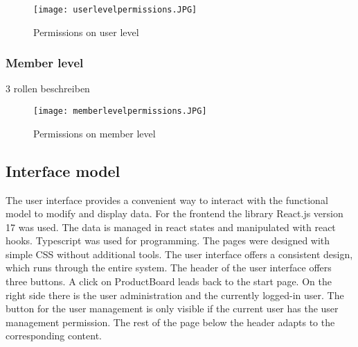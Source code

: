     \begin{figure}[h]
        \centering
        \texttt{[image: userlevelpermissions.JPG]}
        \caption{Permissions on user level}
        \label{tab: userlevelpermissions}
    \end{figure}

    \subsubsection*{Member level}
    3 rollen beschreiben

    \begin{figure}[h]
        \centering
        \texttt{[image: memberlevelpermissions.JPG]}
        \caption{Permissions on member level}
        \label{tab: memberlevelpermissions}
    \end{figure}
    



    \subsection*{Interface model} 
    The user interface provides a convenient way to interact with the functional model to modify and display data. For the frontend the library React.js version 17 was used. The data is managed in react states and manipulated with react hooks. Typescript was used for programming. The pages were designed with simple CSS without additional tools. The user interface offers a consistent design, which runs through the entire system. The header of the user interface offers three buttons. A click on ProductBoard leads back to the start page. On the right side there is the user administration and the currently logged-in user. The button for the user management is only visible if the current user has the user management permission. The rest of the page below the header adapts to the corresponding content.


